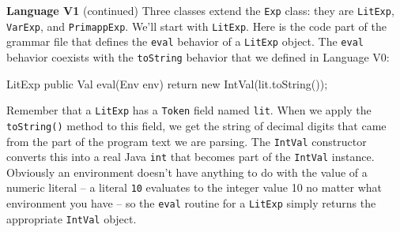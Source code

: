 \begin{minipage}[t]{\sw}
\slidenumber
\LARGE
{\bf Language V1} (continued)\exx
Three classes extend the \verb'Exp' class: they are
\verb'LitExp', \verb'VarExp', and \verb'PrimappExp'.
We'll start with \verb'LitExp'.
Here is the code part of the grammar file
that defines the \verb'eval' behavior of a \verb'LitExp' object.
The \verb'eval' behavior coexists with the \verb'toString' behavior
that we defined in Language V0:
\begin{qv}
LitExp
    public Val eval(Env env) {
        return new IntVal(lit.toString());
    }
\end{qv}
Remember that a \verb'LitExp' has a \verb'Token' field named \verb'lit'.
When we apply the \verb'toString()' method to this field,
we get the string of decimal digits
that came from the part of the program text we are parsing.
The \verb'IntVal' constructor converts this into a real Java \verb'int'
that becomes part of the \verb'IntVal' instance.
Obviously an environment doesn't have anything to do
with the value of a numeric literal --
a literal \verb'10' evaluates to the integer value 10
no matter what environment you have --
so the \verb'eval' routine for a \verb'LitExp'
simply returns the appropriate \verb'IntVal' object.
\end{minipage}
\clearpage
